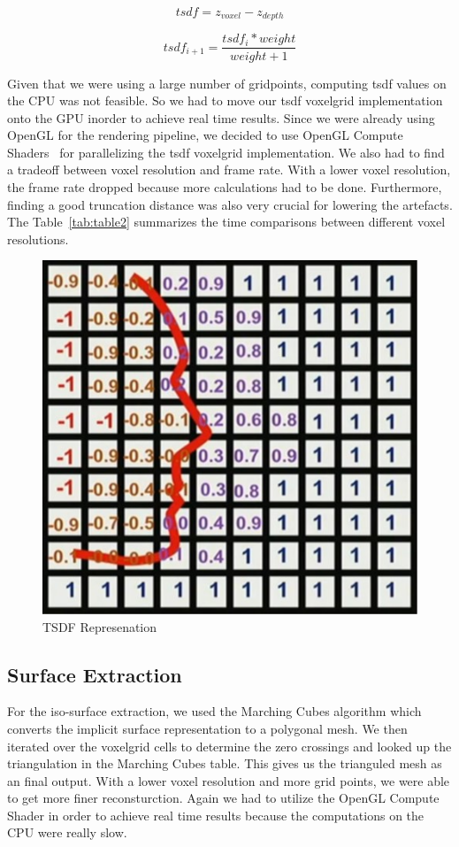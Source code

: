 \documentclass[10pt,twocolumn,letterpaper]{article}
\begin{document}
\begin{equation}\label{eq1}
tsdf=z_{voxel} - z_{depth}
\end{equation}

\begin{equation}\label{eq2}
tsdf_{i+1}=\frac{tsdf_{i} * weight}{weight+1}
\end{equation}

Given that we were using a large number of gridpoints, computing tsdf values on the CPU was not feasible. So we had to move our tsdf voxelgrid implementation onto the GPU inorder to achieve real time results. Since we were already using OpenGL for the rendering pipeline, we decided to use OpenGL Compute Shaders~\cite{Authors1} for parallelizing the tsdf voxelgrid implementation. We also had to find a tradeoff between voxel resolution and frame rate. With a lower voxel resolution, the frame rate dropped because more calculations had to be done. Furthermore, finding a good truncation distance was also very crucial for lowering the artefacts. The Table~\ref{tab:table2} summarizes the time comparisons between different voxel resolutions.

\begin{figure}[t]
\begin{center}
\includegraphics[width=0.6\linewidth]{imgs/tsdf}
\end{center}
 \caption{TSDF Represenation}
\end{figure}

\subsection{Surface Extraction}
For the iso-surface extraction, we used the Marching Cubes algorithm which converts the implicit surface representation to a polygonal mesh. We then iterated over the voxelgrid cells to determine the zero crossings and looked up the triangulation in the Marching Cubes table. This gives us the trianguled mesh as an final output. With a lower voxel resolution and more grid points, we were able to get more finer reconsturction. Again we had to utilize the OpenGL Compute Shader in order to achieve real time results because the computations on the CPU were really slow.
\end{document}
